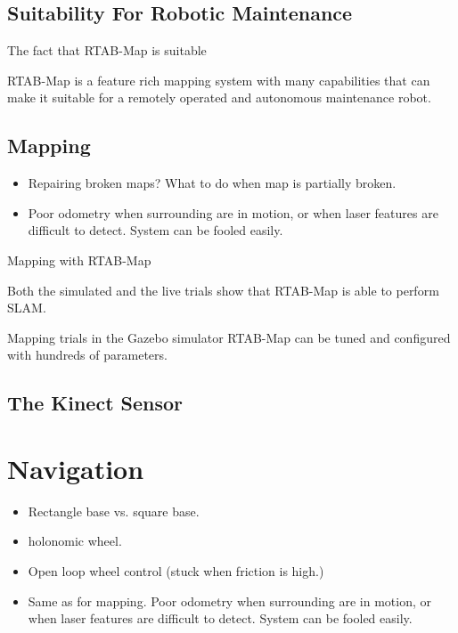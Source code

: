 \subsection{Suitability For Robotic Maintenance}

The fact that \ac{RTAB-Map} is suitable

\ac{RTAB-Map} is a feature rich mapping system with many capabilities that can make it suitable for a remotely operated and autonomous maintenance robot. 

\subsection{Mapping}

\begin{itemize}
\item Repairing broken maps? What to do when map is partially broken.
\item Poor odometry when surrounding are in motion, or when laser features are difficult to detect. System can be fooled easily. 
\end{itemize}

Mapping with \ac{RTAB-Map} 

Both the simulated and the live trials show that \ac{RTAB-Map} is able to perform \ac{SLAM}. 

Mapping trials in the Gazebo simulator
\ac{RTAB-Map} can be tuned and configured with hundreds of parameters.

\subsection{The Kinect Sensor}



\section{Navigation}
\begin{itemize}
\item Rectangle base vs. square base.
\item holonomic wheel.
\item Open loop wheel control (stuck when friction is high.)
\item Same as for mapping. Poor odometry when surrounding are in motion, or when laser features are difficult to detect. System can be fooled easily. 
\end{itemize}


